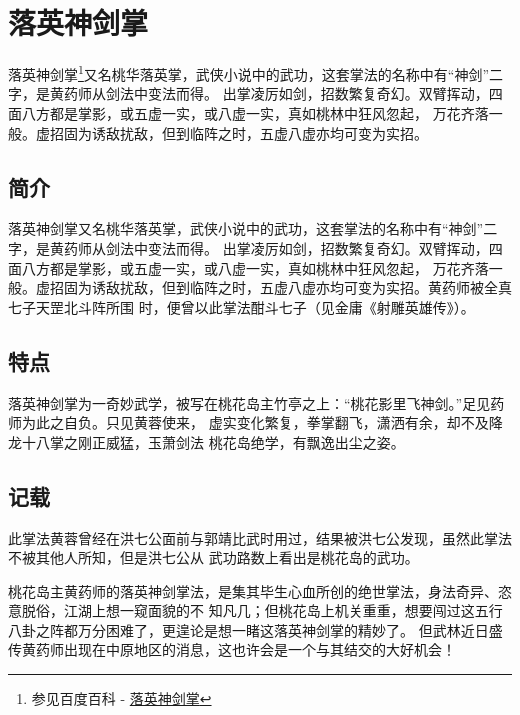 \chapter{落英神剑掌}
落英神剑掌\footnote{参见百度百科 - \href{http://baike.baidu.com/view/84720.htm\#sub84720}{落英神剑掌}}又名桃华落英掌，武侠小说中的武功，这套掌法的名称中有“神剑”二字，是黄药师从剑法中变法而得。
出掌凌厉如剑，招数繁复奇幻。双臂挥动，四面八方都是掌影，或五虚一实，或八虚一实，真如桃林中狂风忽起，
万花齐落一般。虚招固为诱敌扰敌，但到临阵之时，五虚八虚亦均可变为实招。

\section{简介}
落英神剑掌又名桃华落英掌，武侠小说中的武功，这套掌法的名称中有“神剑”二字，是黄药师从剑法中变法而得。
出掌凌厉如剑，招数繁复奇幻。双臂挥动，四面八方都是掌影，或五虚一实，或八虚一实，真如桃林中狂风忽起，
万花齐落一般。虚招固为诱敌扰敌，但到临阵之时，五虚八虚亦均可变为实招。黄药师被全真七子天罡北斗阵所围
时，便曾以此掌法酣斗七子（见金庸《射雕英雄传》）。

\section{特点}
落英神剑掌为一奇妙武学，被写在桃花岛主竹亭之上：“桃花影里飞神剑。”足见药师为此之自负。只见黄蓉使来，
虚实变化繁复，拳掌翻飞，潇洒有余，却不及降龙十八掌之刚正威猛，玉萧剑法 桃花岛绝学，有飘逸出尘之姿。

\section{记载}
此掌法黄蓉曾经在洪七公面前与郭靖比武时用过，结果被洪七公发现，虽然此掌法不被其他人所知，但是洪七公从
武功路数上看出是桃花岛的武功。

桃花岛主黄药师的落英神剑掌法，是集其毕生心血所创的绝世掌法，身法奇异、恣意脱俗，江湖上想一窥面貌的不
知凡几；但桃花岛上机关重重，想要闯过这五行八卦之阵都万分困难了，更遑论是想一睹这落英神剑掌的精妙了。
但武林近日盛传黄药师出现在中原地区的消息，这也许会是一个与其结交的大好机会！

